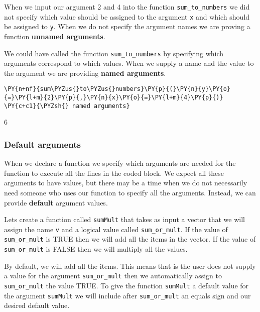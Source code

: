 When we input our argument 2 and 4 into the function
\texttt{sum\_to\_numbers} we did not specify which value should be
assigned to the argument \texttt{x} and which should be assigned to
\texttt{y}. When we do not specify the argument names we are proving a
function \textbf{unnamed arguments}.

We could have called the function \texttt{sum\_to\_numbers} by
specifying which arguments correspond to which values. When we supply a
name and the value to the argument we are providing \textbf{named
arguments}.

    \begin{tcolorbox}[breakable, size=fbox, boxrule=1pt, pad at break*=1mm,colback=cellbackground, colframe=cellborder]
\begin{Verbatim}[commandchars=\\\{\}]
\PY{n+nf}{sum\PYZus{}to\PYZus{}numbers}\PY{p}{(}\PY{n}{y}\PY{o}{=}\PY{l+m}{2}\PY{p}{,}\PY{n}{x}\PY{o}{=}\PY{l+m}{4}\PY{p}{)} \PY{c+c1}{\PYZsh{} named arguments}
\end{Verbatim}
\end{tcolorbox}

    6

    
    \hypertarget{default-arguments}{%
\subsubsection{Default arguments}\label{default-arguments}}

When we declare a function we specify which arguments are needed for the
function to execute all the lines in the coded block. We expect all
these arguments to have values, but there may be a time when we do not
necessarily need someone who uses our function to specify all the
arguments. Instead, we can provide \textbf{default} argument values.

Lets create a function called \texttt{sumMult} that takes as input a
vector that we will assign the name \texttt{v} and a logical value
called \texttt{sum\_or\_mult}. If the value of \texttt{sum\_or\_mult} is
TRUE then we will add all the items in the vector. If the value of
\texttt{sum\_or\_mult} is FALSE then we will multiply all the values.

By default, we will add all the items. This means that is the user does
not supply a value for the argument \texttt{sum\_or\_mult} then we
automatically assign to \texttt{sum\_or\_mult} the value TRUE. To give
the function \texttt{sumMult} a default value for the argument
\texttt{sumMult} we will include after \texttt{sum\_or\_mult} an equals
sign and our desired default value.

